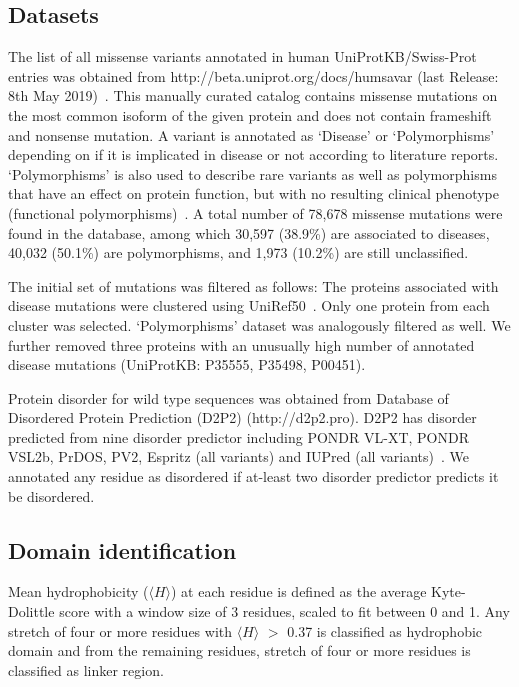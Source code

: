 \documentclass[10pt,letterpaper]{article}
\begin{document}
\subsection*{Datasets}
The list of all missense variants annotated in human UniProtKB/Swiss-Prot entries was obtained from http://beta.uniprot.org/docs/humsavar (last Release: 8th May 2019)~\cite{Yip2008a}. This manually curated catalog contains missense mutations on the most common isoform of the given protein and does not contain frameshift and nonsense mutation. A variant is annotated as `Disease' or `Polymorphisms' depending on if it is implicated in disease or not according to literature reports. `Polymorphisms' is also used to describe rare variants as well as polymorphisms that have an effect on protein function, but with no resulting clinical phenotype (functional polymorphisms)~\cite{Yip2008a}. A total number of 78,678 missense mutations were found in the database, among which 30,597 (38.9\%) are associated to diseases, 40,032 (50.1\%) are polymorphisms, and 1,973 (10.2\%) are still unclassified. 

The initial set of mutations was filtered as follows: The proteins associated with disease mutations were clustered using UniRef50~\cite{Suzek2015}. Only one protein from each cluster was selected. `Polymorphisms' dataset was analogously filtered as well. We further removed three proteins with an unusually high number of annotated disease mutations (UniProtKB: P35555, P35498, P00451).

Protein disorder for wild type sequences was obtained from Database of Disordered Protein Prediction (D2P2) (http://d2p2.pro). D2P2 has disorder predicted from nine disorder predictor including PONDR VL-XT, PONDR VSL2b, PrDOS, PV2, Espritz (all variants) and IUPred (all variants)~\cite{Oates2012}. We annotated any residue as disordered if at-least two disorder predictor predicts it be disordered. 

\subsection*{Domain identification} Mean hydrophobicity ($\langle H\rangle$) at each residue is defined as the average Kyte-Dolittle\cite{Kyte1982a} score with a window size of 3 residues, scaled to fit between 0 and 1. Any stretch of four or more residues with $\langle H \rangle$ $>$ 0.37 is classified as hydrophobic domain and from the remaining residues, stretch of four or more residues is classified as linker region.
\end{document}
